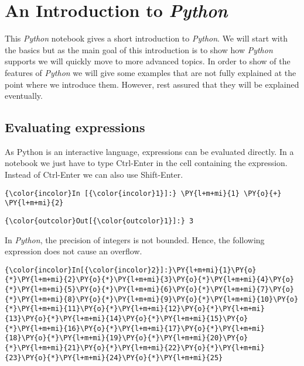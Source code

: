 \section{\texorpdfstring{An Introduction to
\textsl{Python}}{An Introduction to Python}}\label{an-introduction-to-python}
This \textsl{Python} notebook gives a short introduction to \textsl{Python}.
We will start with the basics but as the main goal of this introduction
is to show how \textsl{Python} supports  we will quickly move
to more advanced topics. In order to show of the features of
\textsl{Python} we will give some examples that are not fully explained at
the point where we introduce them. However, rest assured that they will
be explained eventually.

\subsection{Evaluating expressions}\label{evaluating-expressions}
As Python is an interactive language, expressions can be evaluated
directly. In a  notebook we just have to type Ctrl-Enter
in the cell containing the expression. Instead of Ctrl-Enter we can also
use Shift-Enter.

\begin{Verbatim}[commandchars=\\\{\}]
{\color{incolor}In [{\color{incolor}1}]:} \PY{l+m+mi}{1} \PY{o}{+} \PY{l+m+mi}{2}
\end{Verbatim}

\begin{Verbatim}[commandchars=\\\{\}]
{\color{outcolor}Out[{\color{outcolor}1}]:} 3
\end{Verbatim}
            
In \textsl{Python}, the precision of integers is not bounded. Hence, the
following expression does not cause an overflow.

    \begin{Verbatim}[commandchars=\\\{\}]
{\color{incolor}In[{\color{incolor}2}]:}\PY{l+m+mi}{1}\PY{o}{*}\PY{l+m+mi}{2}\PY{o}{*}\PY{l+m+mi}{3}\PY{o}{*}\PY{l+m+mi}{4}\PY{o}{*}\PY{l+m+mi}{5}\PY{o}{*}\PY{l+m+mi}{6}\PY{o}{*}\PY{l+m+mi}{7}\PY{o}{*}\PY{l+m+mi}{8}\PY{o}{*}\PY{l+m+mi}{9}\PY{o}{*}\PY{l+m+mi}{10}\PY{o}{*}\PY{l+m+mi}{11}\PY{o}{*}\PY{l+m+mi}{12}\PY{o}{*}\PY{l+m+mi}{13}\PY{o}{*}\PY{l+m+mi}{14}\PY{o}{*}\PY{l+m+mi}{15}\PY{o}{*}\PY{l+m+mi}{16}\PY{o}{*}\PY{l+m+mi}{17}\PY{o}{*}\PY{l+m+mi}{18}\PY{o}{*}\PY{l+m+mi}{19}\PY{o}{*}\PY{l+m+mi}{20}\PY{o}{*}\PY{l+m+mi}{21}\PY{o}{*}\PY{l+m+mi}{22}\PY{o}{*}\PY{l+m+mi}{23}\PY{o}{*}\PY{l+m+mi}{24}\PY{o}{*}\PY{l+m+mi}{25}
\end{Verbatim}


